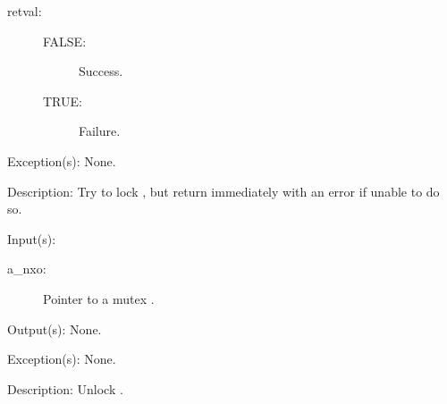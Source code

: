 \begin{capi}
\begin{capilist}
\begin{description}
		\item[retval: ]
			\begin{description}\item[]
			\item[FALSE: ]
				Success.
			\item[TRUE: ]
				Failure.
			\end{description}
		\end{description}
	\item[Exception(s): ] None.
	\item[Description: ]
		Try to lock , but return immediately with an error
		if unable to do so.
	\end{capilist}
\label{nxo_mutex_unlock}
	\begin{capilist}
	\item[Input(s): ]
		\begin{description}\item[]
		\item[a\_nxo: ]
			Pointer to a mutex .
		\end{description}
	\item[Output(s): ] None.
	\item[Exception(s): ] None.
	\item[Description: ]
		Unlock .
	\end{capilist}
\end{capi}
